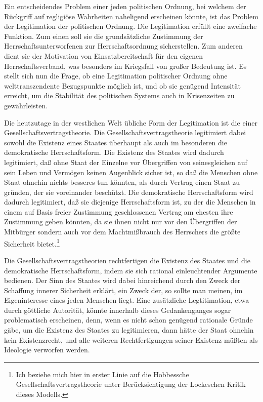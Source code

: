 Ein entscheidendes Problem einer jeden politischen Ordnung, bei welchem der
Rückgriff auf regligiöse Wahrheiten naheligend erscheinen könnte, ist das
Problem der Legitimation der politischen Ordnung. Die Legitimation erfüllt
eine zweifache Funktion. Zum einen soll sie die grundsätzliche Zustimmung der
Herrschaftsunterworfenen zur Herrschaftsordnung sicherstellen. Zum anderen
dient sie der Motivation von Einsatzbereitschaft für den eigenen
Herrschaftsverband, was besonders im Kriegsfall von großer Bedeutung ist. Es
stellt sich nun die Frage, ob eine Legitimation politischer Ordnung ohne
welttranszendente Bezugspunkte möglich ist, und ob sie genügend Intensität
erreicht, um die Stabilität des politischen Systems auch in Krisenzeiten zu
gewährleisten.

Die heutzutage in der westlichen Welt übliche Form der Legitimation ist die
einer Gesellschaftsvertragstheorie. Die Gesellschaftsvertragstheorie
legitimiert dabei sowohl die Existenz eines Staates überhaupt als auch im
besonderen die demokratische Herrschaftsform. Die Existenz des Staates wird
dadurch legitimiert, daß ohne Staat der Einzelne vor Übergriffen von
seinesgleichen auf sein Leben und Vermögen keinen Augenblick sicher ist, so
daß die Menschen ohne Staat ohnehin nichts besseres tun könnten, als durch
Vertrag einen Staat zu gründen, der sie voreinander beschützt. Die
demokratische Herrschaftsform wird dadurch legitimiert, daß sie diejenige
Herrschaftsform ist, zu der die Menschen in einem auf Basis freier Zustimmung
geschlossenen Vertrag am ehesten ihre Zustimmung geben könnten, da sie ihnen
nicht nur vor den Übergriffen der Mitbürger sondern auch vor dem
Machtmißbrauch des Herrschers die größte Sicherheit bietet.\footnote{Ich
  beziehe mich hier in erster Linie auf die Hobbessche
  Gesellschaftsvertragstheorie unter Berücksichtigung der Lockeschen Kritik
  dieses Modells.}

Die Gesellschaftsvertragstheorien rechtfertigen die Existenz des Staates und
die demokratische Herrschaftsform, indem sie sich rational einleuchtender
Argumente bedienen. Der Sinn des Staates wird dabei hinreichend durch den
Zweck der Schaffung innerer Sicherheit erklärt, ein Zweck der, so sollte man
meinen, im Eigeninteresse eines jeden Menschen liegt. Eine zusätzliche
Legtitimation, etwa durch göttliche Autorität, könnte innerhalb dieses
Gedankenganges sogar problematisch erscheinen, denn, wenn es nicht schon
genügend rationale Gründe gäbe, um die Existenz des Staates zu legitimieren,
dann hätte der Staat ohnehin kein Existenzrecht, und alle weiteren
Rechtfertigungen seiner Existenz müßten als Ideologie verworfen werden.

